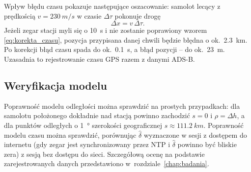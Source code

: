 Wpływ błędu czasu pokazuje następujące oszacowanie: samolot lecący
z prędkością $v = \SI{230}{m/s}$ w czasie $\Delta\tau$ pokonuje drogę
\begin{equation}
  \Delta x = v \, \Delta\tau .
  \label{eq:blad_czasu}
\end{equation}
Jeżeli zegar stacji myli się o \SI{10}{s} i nie zostanie poprawiony wzorem
\eqref{eq:korekta_czasu}, pozycja przypisana danej chwili będzie błędna
o ok.\ \SI{2.3}{km}. Po korekcji błąd czasu spada do ok.\ \SI{0.1}{s},
a błąd pozycji -- do ok.\ \SI{23}{m}. Uzasadnia to rejestrowanie czasu GPS
razem z danymi ADS-B.

\subsection{Weryfikacja modelu}
\label{sec:model_weryfikacja}

Poprawność modelu odległości można sprawdzić na prostych przypadkach:
dla samolotu położonego dokładnie nad stacją powinno zachodzić $s = 0$
i $\rho = \Delta h$, a dla punktów odległych o \SI{1}{\degree} szerokości
geograficznej $s \approx \SI{111.2}{km}$. Poprawność modelu czasu można
sprawdzić, porównując $\hat{\delta}$ wyznaczone w sesji z dostępem do
internetu (gdy zegar jest synchronizowany przez NTP i $\hat{\delta}$ powinno
być bliskie zera) z sesją bez dostępu do sieci. Szczegółową ocenę na
podstawie zarejestrowanych danych przedstawiono w~rozdziale~\ref{chap:badania}.